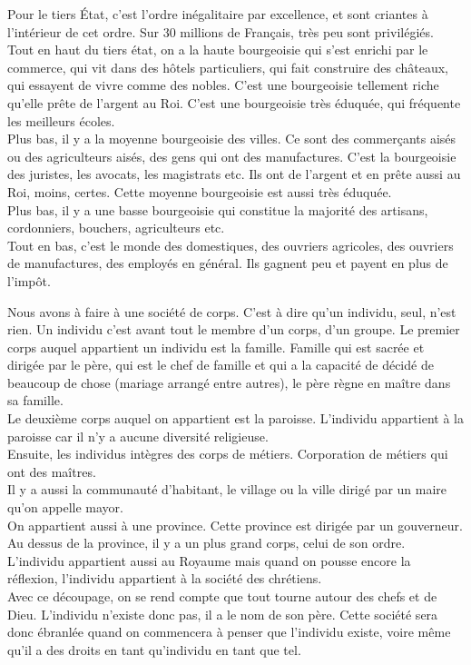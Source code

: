 \documentclass[10pt, a4paper, openany]{book}
\begin{document}
Pour le tiers État, c'est l'ordre inégalitaire par excellence, et sont criantes à l'intérieur de cet ordre. Sur 30 millions de Français, très peu sont privilégiés. \\
Tout en haut du tiers état, on a la haute bourgeoisie qui s'est enrichi par le commerce, qui vit dans des hôtels particuliers, qui fait construire des châteaux, qui essayent de vivre comme des nobles. C'est une bourgeoisie tellement riche qu'elle prête de l'argent au Roi. C'est une bourgeoisie très éduquée, qui fréquente les meilleurs écoles. \\
Plus bas, il y a la moyenne bourgeoisie des villes. Ce sont des commerçants aisés ou des agriculteurs aisés, des gens qui ont des manufactures. C'est la bourgeoisie des juristes, les avocats, les magistrats etc. Ils ont de l'argent et en prête aussi au Roi, moins, certes. Cette moyenne bourgeoisie est aussi très éduquée. \\
Plus bas, il y a une basse bourgeoisie qui constitue la majorité des artisans, cordonniers, bouchers, agriculteurs etc. \\
Tout en bas, c'est le monde des domestiques, des ouvriers agricoles, des ouvriers de manufactures, des employés en général. Ils gagnent peu et payent en plus de l'impôt. 


Nous avons à faire à une société de corps. C'est à dire qu'un individu, seul, n'est rien. Un individu c'est avant tout le membre d'un corps, d'un groupe. Le premier corps auquel appartient un individu est la famille. Famille qui est sacrée et dirigée par le père, qui est le chef de famille et qui a la capacité de décidé de beaucoup de chose (mariage arrangé entre autres), le père règne en maître dans sa famille. \\
Le deuxième corps auquel on appartient est la paroisse. L'individu appartient à la paroisse car il n'y a aucune diversité religieuse. \\
Ensuite, les individus intègres des corps de métiers. Corporation de métiers qui ont des maîtres. \\
Il y a aussi la communauté d'habitant, le village ou la ville dirigé par un maire qu'on appelle mayor. \\
On appartient aussi à une province. Cette province est dirigée par un gouverneur. Au dessus de la province, il y a un plus grand corps, celui de son ordre. \\
L'individu appartient aussi au Royaume mais quand on pousse encore la réflexion, l'individu appartient à la société des chrétiens. \\
Avec ce découpage, on se rend compte que tout tourne autour des chefs et de Dieu. L'individu n'existe donc pas, il a le nom de son père. Cette société sera donc ébranlée quand on commencera à penser que l'individu existe, voire même qu'il a des droits en tant qu'individu en tant que tel.
\end{document}
